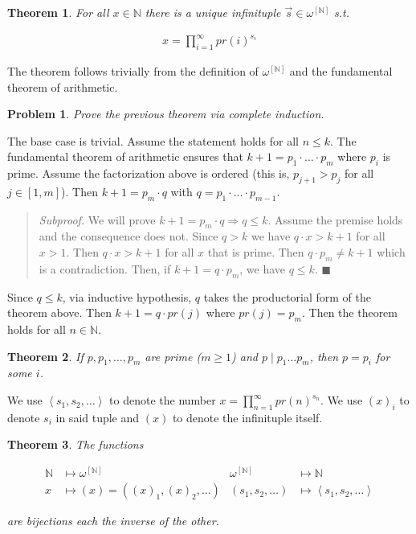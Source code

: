 \documentclass[a4paper, 12pt]{article}
\newtheorem{problem}{Problem}
\newtheorem{theorem}{Theorem}
\newtheorem{problem}{Problem}
\newtheorem{theorem}{Theorem}
\begin{document}
\begin{theorem}
    For all $x \in \mathbb{N}$ there is a unique infinituple $\overrightarrow{s}
    \in \omega^{[\mathbb{N}]}$ s.t. 

    \begin{align*}
        x = \prod_{i=1}^{\infty} pr(i)^{s_i}
    \end{align*}
\end{theorem}

The theorem follows trivially from the definition of $\omega^{[\mathbb{N}]}$ and
the fundamental theorem of arithmetic. 

\begin{problem}
    Prove the previous theorem via complete induction.
\end{problem}

The base case is trivial. Assume the statement holds for all $n \leq k$. The
fundamental theorem of arithmetic ensures that $k + 1 = p_1 \cdot \ldots \cdot
p_m$ where $p_i$ is prime. Assume the factorization above is ordered (this is,
$p_{j + 1} > p_j$ for all $j \in [1, m]$). Then $k + 1 = p_m \cdot q$ with $q =
p_1 \cdot \ldots \cdot p_{m - 1}$. 

\small
\begin{quote}
    \textit{Subproof.} We will prove $k + 1 = p_m \cdot q \Rightarrow q \leq k$.
    Assume the premise holds and the consequence does not. Since $q > k$ we have
    $q \cdot x > k + 1$ for all $x > 1$. Then $q \cdot x > k + 1$ for all $x$
    that is prime. Then $q \cdot p_m \neq k + 1$ which is a contradiction. Then,
    if $k + 1 = q \cdot p_m$, we have $q \leq k$. $\blacksquare$
\end{quote}
\normalsize

Since $q \leq k$, via inductive hypothesis, $q$ takes the productorial form of
the theorem above. Then $k + 1 = q \cdot pr(j)$ where $pr(j) = p_m$. Then the
theorem holds for all $n \in \mathbb{N}$.

\begin{theorem}
    If $p, p_1, \ldots, p_m$ are prime ($m \geq 1$) and $p \mid p_1 \ldots p_m$,
    then $p = p_i$ for some $i$.
\end{theorem}

We use $\left\langle  s_1, s_2, \ldots  \right\rangle$ to denote the number $x =
\prod_{n=1}^{\infty} pr(n)^{s_n}$. We use $(x)_i$ to denote $s_i$ in said tuple
and $(x)$ to denote the infinituple itself.

\begin{theorem}
    The functions 

    \begin{align*}
        \mathbb{N} &\mapsto \omega^{[\mathbb{N}]} &
        \omega^{[\mathbb{N}]}&\mapsto \mathbb{N} \\  
        x &\mapsto (x) = \left( (x)_1, (x)_2, \ldots \right) & (s_1, s_2,
        \ldots)&\mapsto \left\langle  s_1, s_2,\ldots  \right\rangle
    \end{align*}

    are bijections each the inverse of the other.
\end{theorem}
\end{document}
